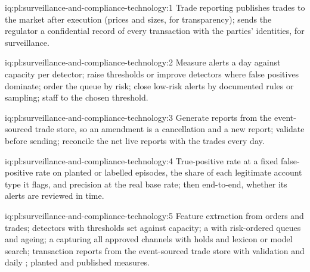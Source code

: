 \begin{solution}{iq:pl:surveillance-and-compliance-technology:1}
Trade reporting publishes trades to the market after execution (prices and sizes, for transparency);  sends the
regulator a confidential record of every transaction with the parties' identities, for surveillance.
\end{solution}

\begin{solution}{iq:pl:surveillance-and-compliance-technology:2}
Measure alerts a day against capacity per detector; raise thresholds or improve detectors where false positives dominate; order the queue by
risk; close low-risk alerts by documented rules or sampling; staff to the chosen threshold.
\end{solution}

\begin{solution}{iq:pl:surveillance-and-compliance-technology:3}
Generate reports from the event-sourced trade store, so an amendment is a cancellation and a new report; validate before sending; reconcile
the net live reports with the trades every day.
\end{solution}

\begin{solution}{iq:pl:surveillance-and-compliance-technology:4}
True-positive rate at a fixed false-positive rate on planted or labelled episodes, the share of each legitimate account type it flags, and
precision at the real base rate; then end-to-end, whether its alerts are reviewed in time.
\end{solution}

\begin{solution}{iq:pl:surveillance-and-compliance-technology:5}
Feature extraction from orders and trades; detectors with thresholds set against capacity; a  with risk-ordered queues
and ageing; a  capturing all approved channels with holds and lexicon or model search; transaction reports from the
event-sourced trade store with validation and daily ; planted  and published measures.
\end{solution}
